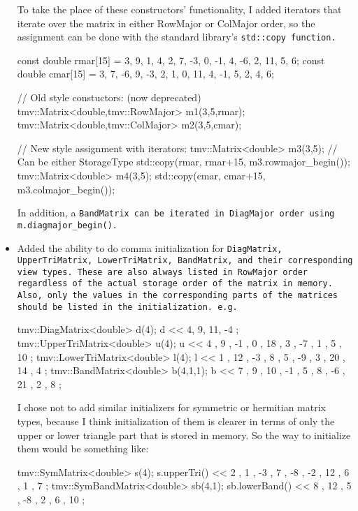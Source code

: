 \begin{itemize}
To take the place of these constructors' functionality, I added iterators that iterate over the matrix in either RowMajor or ColMajor order, so the assignment can be done with the standard library's \tt{std::copy} function.

\begin{tmvcode}
const double rmar[15] = 
    { 3, 9, 1, 4, 2, 7, -3, 0, -1, 4, -6, 2, 11, 5, 6};
const double cmar[15] = 
    { 3, 7, -6, 9, -3, 2, 1, 0, 11, 4, -1, 5, 2, 4, 6};

// Old style constuctors: (now deprecated)
tmv::Matrix<double,tmv::RowMajor> m1(3,5,rmar);
tmv::Matrix<double,tmv::ColMajor> m2(3,5,cmar);

// New style assignment with iterators:
tmv::Matrix<double> m3(3,5); // Can be either StorageType
std::copy(rmar, rmar+15, m3.rowmajor_begin());
tmv::Matrix<double> m4(3,5);
std::copy(cmar, cmar+15, m3.colmajor_begin());
\end{tmvcode}

In addition, a \tt{BandMatrix} can be iterated in DiagMajor order using \tt{m.diagmajor_begin()}.

\item 
Added the ability to do comma initialization for \tt{DiagMatrix}, \tt{UpperTriMatrix}, \tt{LowerTriMatrix}, \tt{BandMatrix}, and their corresponding view types.  These are also always listed in RowMajor order regardless of the actual storage order of the matrix in memory.  Also, only the values in the corresponding parts of the matrices should be listed in the initialization.  e.g.
\begin{tmvcode}
tmv::DiagMatrix<double> d(4);
d << 4,
        9,
           11,
              -4 ;
tmv::UpperTriMatrix<double> u(4);
u << 4 ,  9 , -1 ,  0 ,
         18 ,  3 , -7 ,
               1 ,  5 ,
                   10 ;
tmv::LowerTriMatrix<double> l(4);
l <<  1 ,
     12 , -3 ,
      8 ,  5 , -9 ,
      3 , 20 , 14 ,  4 ;
tmv::BandMatrix<double> b(4,1,1);
b <<  7 ,  9 ,
     10 , -1 ,  5 ,
           8 , -6 , 21 ,
                2 ,  8 ;
\end{tmvcode}

I chose not to add similar initializers for symmetric or hermitian matrix types, because I think initialization of them is clearer in terms of only the upper or lower triangle part that is stored in memory.  So the way to initialize them would be something like:
\begin{tmvcode}
tmv::SymMatrix<double> s(4);
s.upperTri() << 2 ,  1 , -3 ,  7 ,
                    -8 , -2 , 12 ,
                          6 ,  1 ,
                               7 ;
tmv::SymBandMatrix<double> sb(4,1);
sb.lowerBand() <<  8 ,
                  12 ,  5 ,
                       -8 ,  2 ,
                             6 , 10 ;
\end{tmvcode}


\end{itemize}
